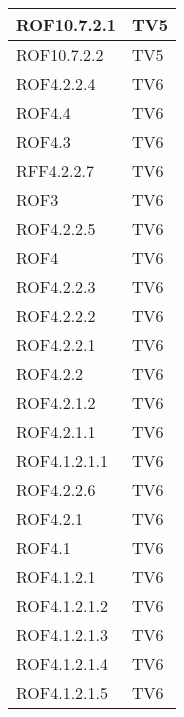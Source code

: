 \begin{center}
\begin{longtable}{|p{7cm}|p{7cm}|}
\midrule
ROF10.7.2.1
& TV5\\

\midrule
ROF10.7.2.2
& TV5\\

\midrule
ROF4.2.2.4
& TV6\\

\midrule
ROF4.4
& TV6\\

\midrule
ROF4.3
& TV6\\

\midrule
RFF4.2.2.7
& TV6\\

\midrule
ROF3
& TV6\\

\midrule
ROF4.2.2.5
& TV6\\

\midrule
ROF4
& TV6\\

\midrule
ROF4.2.2.3
& TV6\\

\midrule
ROF4.2.2.2
& TV6\\

\midrule
ROF4.2.2.1
& TV6\\

\midrule
ROF4.2.2
& TV6\\

\midrule
ROF4.2.1.2
& TV6\\

\midrule
ROF4.2.1.1
& TV6\\

\midrule
ROF4.1.2.1.1
& TV6\\

\midrule
ROF4.2.2.6
& TV6\\

\midrule
ROF4.2.1
& TV6\\

\midrule
ROF4.1
& TV6\\

\midrule
ROF4.1.2.1
& TV6\\

\midrule
ROF4.1.2.1.2
& TV6\\

\midrule
ROF4.1.2.1.3
& TV6\\

\midrule
ROF4.1.2.1.4
& TV6\\

\midrule
ROF4.1.2.1.5
& TV6\\


\end{longtable}
\end{center}
